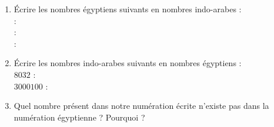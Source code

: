 \begin{enigme}
\begin{enumerate}
      \item Écrire les nombres égyptiens suivants en nombres indo-arabes : \\ [2mm]
      {\Large\textpmhg{\HXthousand\Hthousand\Hthousand\Hten\Hten\Hten\Hten\Hten\Hten}} : \dotfill \\ [3mm]
      {\Large\textpmhg{\HCthousand\HXthousand\HXthousand\HXthousand\Hthousand\Hthousand\Hthousand\Hhundred\Hhundred\Hhundred\Hten\Hten\Hten\Hten\Hone\Hone\Hone\Hone\Hone\Hone\Hone\Hone}} : \dotfill \\  [3mm]
      {\Large\textpmhg{\Hmillion\Hmillion\Hmillion\HCthousand\Hone\Hone}} : \dotfill \\
      \item Écrire les nombres indo-arabes suivants en nombres égyptiens : \\ [4mm]
      $\num{8 032}$ : \dotfill \\ [5mm]
      $\num{3 000 100}$ :  \dotfill \\
      \item Quel nombre présent dans notre numération écrite n'existe pas dans la numération égyptienne ? Pourquoi ? \\ [3mm]
      \makebox[\linewidth]{\dotfill}
      \end{enumerate}
\end{enigme}
